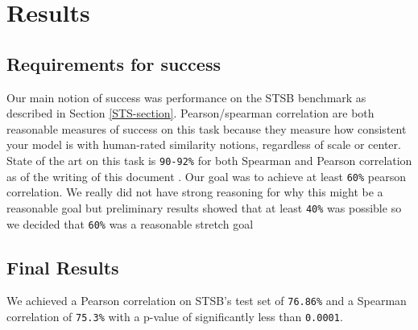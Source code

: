 \documentclass[14pt, twocolumn]{article}
\begin{document}

\section{Results}
\subsection{Requirements for success}
Our main notion of success was performance on the STSB \cite{STS} benchmark as described in Section \ref{STS-section}. Pearson/spearman correlation are both reasonable measures of success on this task because they measure how consistent your model is with human-rated similarity notions, regardless of scale or center. State of the art on this task is \verb|90-92%| for both Spearman and Pearson correlation as of the writing of this document \cite{muennighoff2022mteb}. Our goal was to achieve at least \verb|60%| pearson correlation. We really did not have strong reasoning for why this might be a reasonable goal but preliminary results showed that at least \verb|40%| was possible so we decided that \verb|60%| was a reasonable stretch goal

\subsection{Final Results}
We achieved a Pearson correlation on STSB's test set of \verb|76.86%| and a Spearman correlation of \verb|75.3%| with a p-value of significantly less than \verb|0.0001|.
\end{document}
